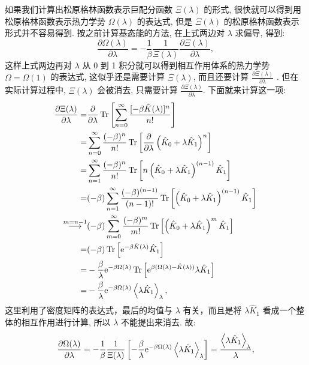 如果我们计算出松原格林函数表示巨配分函数 $\Xi(\lambda)$ 的形式, 很快就可以得到用松原格林函数表示热力学势 $\Omega(\lambda)$ 的表达式, 但是 $\Xi(\lambda)$ 的松原格林函数表示形式并不容易得到. 按之前计算基态能的方法, 在上式两边对 $\lambda$ 求偏导, 得到:
\begin{equation}
\frac{\partial \Omega(\lambda)}{\partial \lambda}=-\frac{1}{\beta} \frac{1}{\Xi(\lambda)} \frac{\partial \Xi(\lambda)}{\partial \lambda},
\end{equation}
这样上式两边再对 $\lambda$ 从 0 到 1 积分就可以得到相互作用体系的热力学势 $\Omega=\Omega(1)$ 的表达式, 这似乎还是需要计算 $\Xi(\lambda)$, 而且还要计算 $\displaystyle\frac{\partial \Xi(\lambda)}{\partial \lambda}$ . 但在实际计算过程中, $\Xi(\lambda)$ 会被消去, 只需要计算 $\displaystyle\frac{\partial \Xi(\lambda)}{\partial \lambda}$. 下面就来计算这一项:
\begin{align}
\frac{\partial \Xi(\lambda)}{\partial \lambda} =&\frac{\partial}{\partial \lambda} \operatorname{Tr}\left[\sum_{n=0}^{\infty} \frac{[-\beta \hat{K}(\lambda)]^n}{n !}\right]\nonumber \\
=&\sum_{n=0}^{\infty} \frac{(-\beta)^n}{n !} \operatorname{Tr}\left[\frac{\partial}{\partial \lambda}\left(\hat{K}_0+\lambda \hat{K}_1\right)^n\right] \nonumber\\
=&\sum_{n=1}^{\infty} \frac{(-\beta)^n}{n !} \operatorname{Tr}\left[n\left(\hat{K}_0+\lambda \hat{K}_1\right)^{(n-1)}\hat{K}_1\right]\nonumber\\
=&(-\beta) \sum_{n=1}^{\infty} \frac{(-\beta)^{(n-1)}}{(n-1) !} \operatorname{Tr}\left[\left(\hat{K}_0+\lambda \hat{K}_1\right)^{(n-1)} \hat{K}_1\right]\nonumber \\
\stackrel{m=n-1}{\longrightarrow} &(-\beta) \sum_{m=0}^{\infty} \frac{(-\beta)^m}{m !} \operatorname{Tr}\left[\left(\hat{K}_0+\lambda \hat{K}_1\right)^m \hat{K}_1\right]\nonumber \\
=&(-\beta) \operatorname{Tr}\left[\mathrm{e}^{-\beta \hat{K}(\lambda)} \hat{K}_1\right] \nonumber\\
=&-\frac{\beta}{\lambda} \mathrm{e}^{-\beta \Omega(\lambda)} \operatorname{Tr}\left[\mathrm{e}^{\beta(\Omega(\lambda)-\hat{K}(\lambda))} \lambda \hat{K}_1\right] \nonumber\\
=&-\frac{\beta}{\lambda} \mathrm{e}^{-\beta \Omega(\lambda)}\left\langle\lambda \hat{K}_1\right\rangle_\lambda,
\end{align}
这里利用了密度矩阵的表达式，最后的均值与 $\lambda$ 有关，而且是将 $\lambda \hat{K}_1$ 看成一个整体的相互作用进行计算, 所以 $\lambda$ 不能提出来消去. 故:
\begin{equation}
\frac{\partial \Omega(\lambda)}{\partial \lambda}=-\frac{1}{\beta}\frac{1}{\Xi(\lambda)}\left[-\frac{\beta}{\lambda} \mathrm{e}^{-\beta \Omega(\lambda)}\left\langle\lambda \hat{K}_1\right\rangle_\lambda\right]=\frac{\left\langle\lambda \hat{K}_1\right\rangle_\lambda}{\lambda},
\end{equation}
